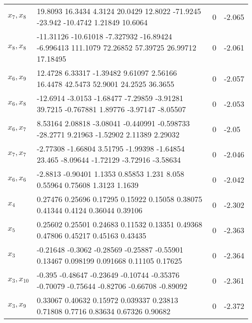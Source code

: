 \begin{tabular}{llll}
$x_7,x_8$ & 19.8093      16.3434       4.3124      20.0429      12.8022     -71.9245      -23.942     -10.4742      1.21849      10.6064 & 0 & -2.065 \\ 
$x_8,x_8$ & -11.31126     -10.61018     -7.327932     -16.89424     -6.996413      111.1079      72.26852      57.39725      26.99712      17.18495 & 0 & -2.061 \\ 
$x_6,x_9$ & 12.4728      6.33317     -1.39482      9.61097      2.56166      16.4478      42.5473      52.9001      24.2525      36.3655 & 0 & -2.057 \\ 
$x_6,x_8$ & -12.6914      -3.0153     -1.68477     -7.29859     -3.91281      39.7215    -0.767881      1.89776     -3.97147     -8.05507 & 0 & -2.053 \\ 
$x_6,x_7$ & 8.53164      2.08818     -3.08041    -0.440991    -0.598733     -28.2771      9.21963     -1.52902      2.11389      2.29032 & 0 & -2.05 \\ 
$x_7,x_7$ & -2.77308     -1.66804      3.51795     -1.99398     -1.64854       23.465     -8.09644     -1.72129     -3.72916     -3.58634 & 0 & -2.046 \\ 
$x_6,x_6$ & -2.8813    -0.90401      1.1353     0.85853       1.231       8.058     0.55964     0.75608      1.3123      1.1639 & 0 & -2.042 \\ 
$x_4$ & 0.27476     0.25696     0.17295     0.15922     0.15058     0.38075     0.41344      0.4124     0.36044     0.39106 & 0 & -2.302 \\ 
$x_5$ & 0.25602     0.25501     0.24683     0.11532     0.13351     0.49368     0.47806     0.45217     0.45163     0.43435 & 0 & -2.363 \\ 
$x_3$ & -0.21648     -0.3062    -0.28569    -0.25887    -0.55901     0.13467    0.098199    0.091668     0.11105     0.17625 & 0 & -2.364 \\ 
$x_3,x_10$ & -0.395    -0.48647    -0.23649    -0.10744    -0.35376    -0.70079    -0.75644    -0.82706    -0.66708    -0.89092 & 0 & -2.361 \\ 
$x_3,x_9$ & 0.33067     0.40632     0.15972    0.039337     0.23813     0.71808      0.7716     0.83634     0.67326     0.90682 & 0 & -2.372 \\ 
\hline 
\end{tabular}